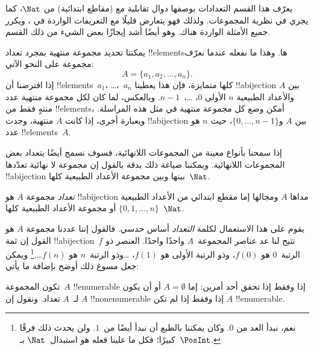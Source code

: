 \documentclass[../../../include/open-logic-section]{subfiles}
\begin{document}


\begin{editorial}
  يعرّف هذا القسم التعدادات بوصفها دوال تقابلية مع (مقاطع ابتدائية)
  من $\Nat$، كما يجري في نظرية المجموعات. ولذلك فهو يتعارض قليلًا مع
  التعريفات الواردة في ، ويكرر جميع الأمثلة الواردة
  هناك. وهو أيضًا أشد إيجازًا بعض الشيء من ذلك القسم.
\end{editorial}

يمكننا تحديد مجموعة منتهية بمجرد تعداد !!{element}sها. وهذا ما نفعله
عندما نعرّف مجموعة على النحو الآتي:
\[
  A = \{a_1, a_2, \ldots, a_n\}.
\]
إذا افترضنا أن !!{element}s~$a_1$، \dots،~$a_n$ كلها متمايزة،
فإن هذا يعطينا !!a{bijection} بين $A$ والأعداد الطبيعية $n$ الأولى
$0$، \dots،~$n-1$. وبالعكس، لما كان لكل مجموعة منتهية عدد منتهٍ فقط
من !!{element}s، أمكن وضع كل مجموعة منتهية في مثل هذه المراسلة.
وبعبارة أخرى، إذا كانت $A$ منتهية، وجدت !!a{bijection} بين $A$
و$\{0, \dots, n-1\}$، حيث $n$ هو عدد !!{element}s~$A$.

إذا سمحنا بأنواع معينة من المجموعات اللانهائية، فسوف نسمح أيضًا
بتعداد بعض المجموعات اللانهائية. ويمكننا صياغة ذلك بدقة بالقول إن
مجموعة لا نهائية تعدّدها !!a{bijection} بينها وبين مجموعة الأعداد
الطبيعية كلها~$\Nat$.

\begin{defn}
\emph{تعداد} مجموعة $A$ هو !!a{bijection} مداها $A$ ومجالها إما
مقطع ابتدائي من الأعداد الطبيعية $\{0, 1, \ldots, n\}$ {أو}
مجموعة الأعداد الطبيعية كلها~$\Nat$.
\end{defn}

\begin{explain}
يقوم على هذا الاستعمال لكلمة \emph{التعداد} أساس حدسي. فالقول إننا
عددنا مجموعة $A$ هو القول إن ثمة !!a{bijection}~$f$ تتيح لنا عد
عناصر المجموعة~$A$ واحدًا واحدًا. العنصر ذو الرتبة~$0$
هو $f(0)$، وذو الرتبة الأولى هو $f(1)$، \ldots وذو الرتبة~$n$ هو
$f(n)$\ldots.\footnote{نعم، نبدأ العد من $0$. وكان يمكننا بالطبع أن
نبدأ أيضًا من~$1$. ولن يحدث ذلك فرقًا كبيرًا؛ فكل ما علينا فعله هو
استبدال~$\Nat$ بـ~$\PosInt$.} ويمكن جعل مسوغ ذلك أوضح بإضافة ما يأتي:
\end{explain}

\begin{defn}
  تكون المجموعة~$A$ !!{enumerable} إذا وفقط إذا تحقق أحد أمرين: إما
  $A = \emptyset$ أو أن يكون لـ~$A$ تعداد. ونقول إن $A$
  !!{nonenumerable} إذا وفقط إذا لم
  تكن $A$ !!{enumerable}.
\end{defn}
\end{document}

